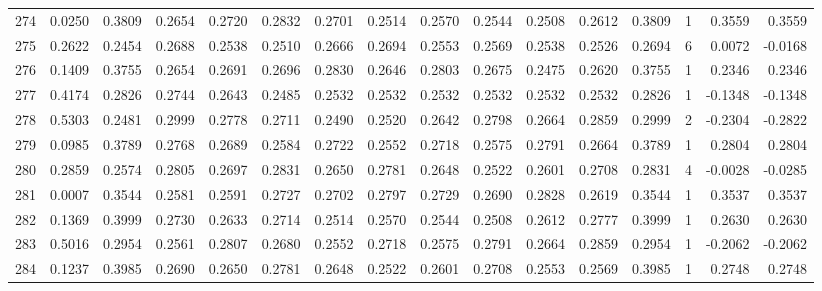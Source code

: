 \begin{tabular}{lrrrrrrrrrrrrrrr}
274 &      0.0250 &  0.3809 &  0.2654 &  0.2720 &  0.2832 &  0.2701 &  0.2514 &  0.2570 &  0.2544 &  0.2508 &   0.2612 &     0.3809 &      1 &                    0.3559 &                     0.3559 \\
275 &      0.2622 &  0.2454 &  0.2688 &  0.2538 &  0.2510 &  0.2666 &  0.2694 &  0.2553 &  0.2569 &  0.2538 &   0.2526 &     0.2694 &      6 &                    0.0072 &                    -0.0168 \\
276 &      0.1409 &  0.3755 &  0.2654 &  0.2691 &  0.2696 &  0.2830 &  0.2646 &  0.2803 &  0.2675 &  0.2475 &   0.2620 &     0.3755 &      1 &                    0.2346 &                     0.2346 \\
277 &      0.4174 &  0.2826 &  0.2744 &  0.2643 &  0.2485 &  0.2532 &  0.2532 &  0.2532 &  0.2532 &  0.2532 &   0.2532 &     0.2826 &      1 &                   -0.1348 &                    -0.1348 \\
278 &      0.5303 &  0.2481 &  0.2999 &  0.2778 &  0.2711 &  0.2490 &  0.2520 &  0.2642 &  0.2798 &  0.2664 &   0.2859 &     0.2999 &      2 &                   -0.2304 &                    -0.2822 \\
279 &      0.0985 &  0.3789 &  0.2768 &  0.2689 &  0.2584 &  0.2722 &  0.2552 &  0.2718 &  0.2575 &  0.2791 &   0.2664 &     0.3789 &      1 &                    0.2804 &                     0.2804 \\
280 &      0.2859 &  0.2574 &  0.2805 &  0.2697 &  0.2831 &  0.2650 &  0.2781 &  0.2648 &  0.2522 &  0.2601 &   0.2708 &     0.2831 &      4 &                   -0.0028 &                    -0.0285 \\
281 &      0.0007 &  0.3544 &  0.2581 &  0.2591 &  0.2727 &  0.2702 &  0.2797 &  0.2729 &  0.2690 &  0.2828 &   0.2619 &     0.3544 &      1 &                    0.3537 &                     0.3537 \\
282 &      0.1369 &  0.3999 &  0.2730 &  0.2633 &  0.2714 &  0.2514 &  0.2570 &  0.2544 &  0.2508 &  0.2612 &   0.2777 &     0.3999 &      1 &                    0.2630 &                     0.2630 \\
283 &      0.5016 &  0.2954 &  0.2561 &  0.2807 &  0.2680 &  0.2552 &  0.2718 &  0.2575 &  0.2791 &  0.2664 &   0.2859 &     0.2954 &      1 &                   -0.2062 &                    -0.2062 \\
284 &      0.1237 &  0.3985 &  0.2690 &  0.2650 &  0.2781 &  0.2648 &  0.2522 &  0.2601 &  0.2708 &  0.2553 &   0.2569 &     0.3985 &      1 &                    0.2748 &                     0.2748 \\

\end{tabular}

